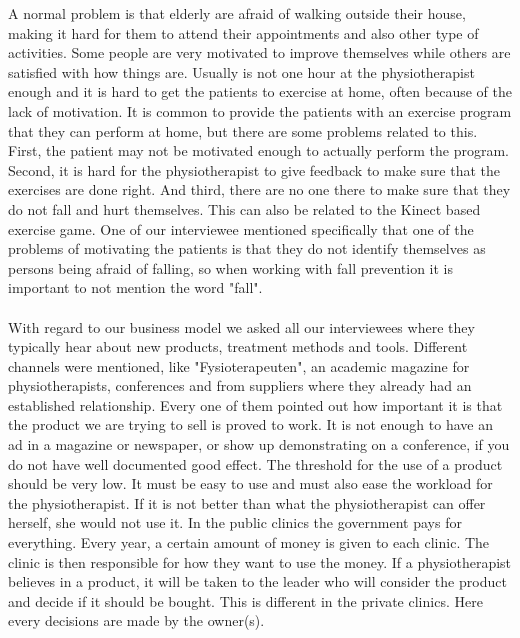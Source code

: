 A normal problem is that elderly are afraid of walking outside their house, making it hard for them to attend their appointments and also other type of activities. Some people are very motivated to improve themselves while others are satisfied with how things are. Usually is not one hour at the physiotherapist enough and it is hard to get the patients to exercise at home, often because of the lack of motivation. It is common to provide the patients with an exercise program that they can perform at home, but there are some problems related to this. First, the patient may not be motivated enough to actually perform the program. Second, it is hard for the physiotherapist to give feedback to make sure that the exercises are done right. And third, there are no one there to make sure that they do not fall and hurt themselves. This can also be related to the Kinect based exercise game. One of our interviewee mentioned specifically that one of the problems of motivating the patients is that they do not identify themselves as  persons being afraid of falling, so when working with fall prevention it is important to not mention the word "fall". \\ \\
With regard to our business model we asked all our interviewees where they typically hear about new products, treatment methods and tools. Different channels were mentioned, like "Fysioterapeuten", an academic magazine for physiotherapists, conferences and from suppliers where they already had an established relationship. Every one of them pointed out how important it is that the product we are trying to sell is proved to work. It is not enough to have an ad in a magazine or newspaper, or show up demonstrating on a conference, if you do not have well documented good effect. The threshold for the use of a product should be very low. It must be easy to use and must also ease the workload for the physiotherapist. If it is not better than what the physiotherapist can offer herself, she would not use it. In the public clinics the government pays for everything. Every year, a certain amount of money is given to each clinic. The clinic is then responsible for how they want to use the money. If a physiotherapist believes in a product, it will be taken to the leader who will consider the product and decide if it should be bought. This is different in the private clinics. Here every decisions are made by the owner(s). \\ \\
